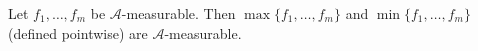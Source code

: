 Let $f_1, \ldots, f_m$ be $\mathcal{A}$-measurable. Then $\max\{f_1, \ldots, f_m\}$ and $\min\{f_1, \ldots, f_m\}$ (defined pointwise) are $\mathcal{A}$-measurable.